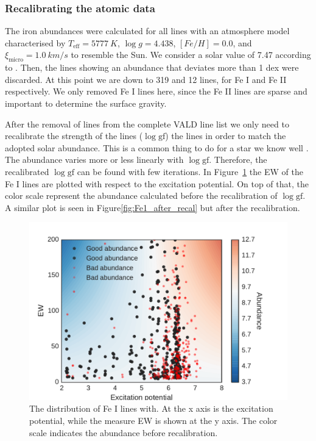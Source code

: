 \documentclass{aa}
\begin{document}
\subsubsection{Recalibrating the atomic data}
\label{ssub:Recalibrating-the-atomic-data}

The iron abundances were calculated for all lines with an atmosphere
model characterised by $T_\mathrm{eff}=\SI{5777}{K}$, $\log g =
4.438$, $[Fe/H] = 0.0$, and $\xi_\mathrm{micro} = \SI{1.0}{km/s}$
to resemble the Sun. We consider a solar value of 7.47 according to
\cite{Gonzales2000}. Then, the lines showing an abundance that deviates
more than 1 dex were discarded. At this point we are down to 319 and 12
lines, for Fe I and Fe II respectively. We only removed Fe I lines here,
since the Fe II lines are sparse and important to determine the surface
gravity.

After the removal of lines from the complete VALD line list we only
need to recalibrate the strength of the lines ($\log \mathrm{gf}$)
the lines in order to match the adopted solar abundance. This is
a common thing to do for a star we know well \citep{2012Onehag}.
The abundance varies more or less linearly with $\log \mathrm{gf}$.
Therefore, the recalibrated $\log \mathrm{gf}$ can be found with few
iterations. In Figure~\ref{fig:Fe1_before_recal} the EW of the Fe I
lines are plotted with respect to the excitation potential. On top
of that, the color scale represent the abundance calculated before
the recalibration of $\log \mathrm{gf}$. A similar plot is seen in
Figure\ref{fig:Fe1_after_recal} but after the recalibration.

\begin{figure}[htpb]
    \centering
    \includegraphics[width=0.9\linewidth]{figures/EWvsEP.pdf}
    \caption{The distribution of Fe I lines with. At the x axis is the
    excitation potential, while the measure EW is shown at the y axis. The
    color scale indicates the abundance before recalibration.}
    \label{fig:Fe1_before_recal}
\end{figure}
\end{document}
